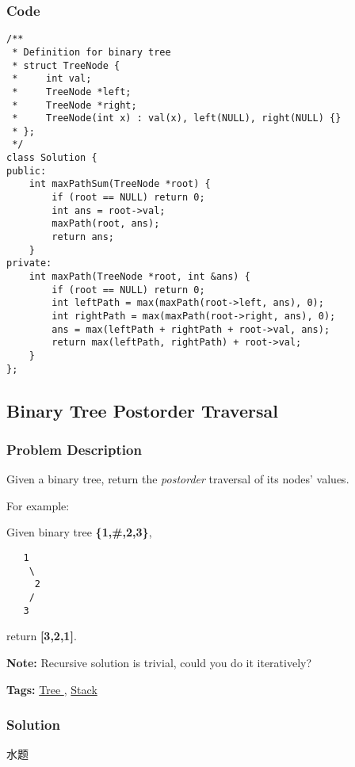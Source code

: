 \documentclass{article}
\begin{document}
\begin{CJK*}{UTF8}{gkai}
\subsubsection*{Code}
\begin{lstlisting}
/**
 * Definition for binary tree
 * struct TreeNode {
 *     int val;
 *     TreeNode *left;
 *     TreeNode *right;
 *     TreeNode(int x) : val(x), left(NULL), right(NULL) {}
 * };
 */
class Solution {
public:
    int maxPathSum(TreeNode *root) {
        if (root == NULL) return 0;
        int ans = root->val;
        maxPath(root, ans);
        return ans;
    }
private:
    int maxPath(TreeNode *root, int &ans) {
        if (root == NULL) return 0;
        int leftPath = max(maxPath(root->left, ans), 0);
        int rightPath = max(maxPath(root->right, ans), 0);
        ans = max(leftPath + rightPath + root->val, ans);
        return max(leftPath, rightPath) + root->val;
    }
}; 
\end{lstlisting}


\subsection{ Binary Tree Postorder Traversal }
\label{ Binary Tree Postorder Traversal }

\subsubsection*{Problem Description}
Given a binary tree, return the \emph{postorder} traversal of its nodes' values.

For example:


Given binary tree \textbf{\{1,\#,2,3\}},


\begin{verbatim}
   1
    \
     2
    /
   3
\end{verbatim}

return \textbf{[3,2,1]}.

\textbf{Note:} Recursive solution is trivial, could you do it iteratively?


\textbf{Tags: }
\hyperref[ Tree ]{ Tree },  \hyperref[ Stack ]{ Stack }



\subsubsection*{Solution}
水题


\end{CJK*}
\end{document}
